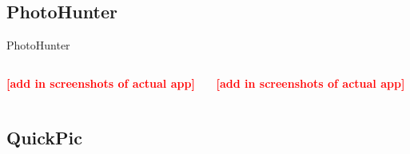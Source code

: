 \documentclass[aspectratio=169]{beamer}
\newcommand{\todo}[1]{\textcolor{red}{\textbf{[#1]}}}
\begin{document}
\subsection{PhotoHunter}

\begin{frame}{PhotoHunter}
  \begin{columns}[c]
    \begin{column}{0.5\columnwidth}
      \centering
			\todo{add in screenshots of actual app}
    \end{column}
    \begin{column}{0.5\columnwidth}
      \centering
			\todo{add in screenshots of actual app}
    \end{column}
  \end{columns}
\end{frame}

\subsection{QuickPic}
\end{document}
